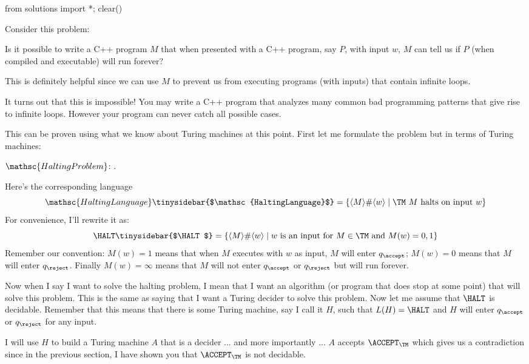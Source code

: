\begin{python0}
from solutions import *; clear()
\end{python0}

Consider this problem:

Is it possible to write a C++ program $M$ that when presented with 
a C++ program, say $P$, with input $w$, $M$ can tell us if $P$
(when compiled and executable) will run forever?

This is definitely helpful since we can use $M$ to prevent us from 
executing programs (with inputs) that contain infinite loops.

It turns out that this is impossible!
You may write a C++ program that analyzes many common bad 
programming patterns
that give rise to infinite loops.
However your program can never catch all possible cases.

This can be proven using what we know about Turing machines at this point.
First let me formulate the problem but in terms of Turing machines:

$\mathsc{HaltingProblem}$:
.

Here's the corresponding language 
\[
\mathsc{HaltingLanguage}\tinysidebar{$\mathsc{HaltingLanguage}$}\index{haltinglanguage@$\mathsc{HaltingLanguage}$} = 
\{
\langle M \rangle \# \langle w \rangle \mid \TM \ M \text{ halts on input }
w\}
\]
For convenience, I'll rewrite it as:
\[
\HALT\tinysidebar{$\HALT$}\index{halt@$\HALT$}
= \{\langle M \rangle \# \langle w \rangle 
\mid 
\text{$w$ is an input for $M \in \TM$ and }
M(w) = 0, 1\}
\]
Remember our convention:
$M(w) = 1$ means that when $M$ executes with $w$ as input, $M$
will enter $q_\accept$;
$M(w) = 0$ means that $M$ will enter $q_\reject$.
Finally $M(w) = \infty$ means that $M$ will not enter $q_\accept$
or $q_\reject$ but will run forever.

Now when I say I want to solve the halting problem, I mean that 
I want an algorithm (or program that does stop at some point)
that will solve this problem.
This is the same as saying that I want a Turing decider to solve
this problem.
Now let me assume that $\HALT$ is decidable.
Remember that this means that there is some Turing machine,
say I call it $H$,
such that $L(H) = \HALT$ and $H$ will 
enter $q_\accept$ or $q_\reject$ for any input.

I will use $H$ to build a Turing machine $A$ that is a decider ...
and more importantly ... $A$ accepts $\ACCEPT_\TM$
which gives us a contradiction since in the previous section,
I have shown you that $\ACCEPT_\TM$ is not decidable.


